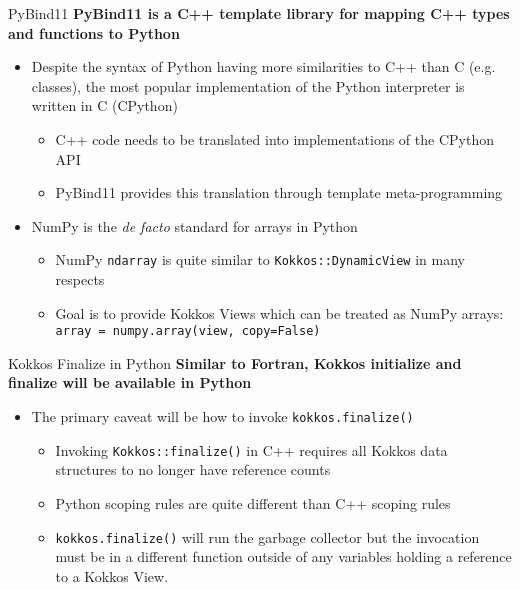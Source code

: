 \begin{frame}[fragile]{PyBind11}
\textbf{PyBind11 is a C++ template library for mapping C++ types and functions to Python}

\begin{itemize}
  \item Despite the syntax of Python having more similarities to C++ than C (e.g. classes), 
  the most popular implementation of the Python interpreter is written in C (CPython)
  \begin{itemize}
    \item C++ code needs to be translated into implementations of the CPython API
    \item PyBind11 provides this translation through template meta-programming
  \end{itemize}
  \item NumPy is the \textit{de facto} standard for arrays in Python
  \begin{itemize}
     \item NumPy \lstinline|ndarray| is quite similar to \lstinline|Kokkos::DynamicView| in many respects
     \item Goal is to provide Kokkos Views which can be treated as NumPy arrays: \lstinline|array = numpy.array(view, copy=False)|
  \end{itemize}
\end{itemize}

\end{frame}

\begin{frame}[fragile]{Kokkos Finalize in Python}
\textbf{Similar to Fortran, Kokkos initialize and finalize will be available in Python}

\begin{itemize}
  \item The primary caveat will be how to invoke \lstinline|kokkos.finalize()|
  \begin{itemize}
  \item Invoking \lstinline|Kokkos::finalize()| in C++ requires all Kokkos data structures to no longer have reference counts
  \item Python scoping rules are quite different than C++ scoping rules
  \item \lstinline|kokkos.finalize()| will run the garbage collector but the invocation must be in a different function
  outside of any variables holding a reference to a Kokkos View.
  \end{itemize}
\end{itemize}

\end{frame}

